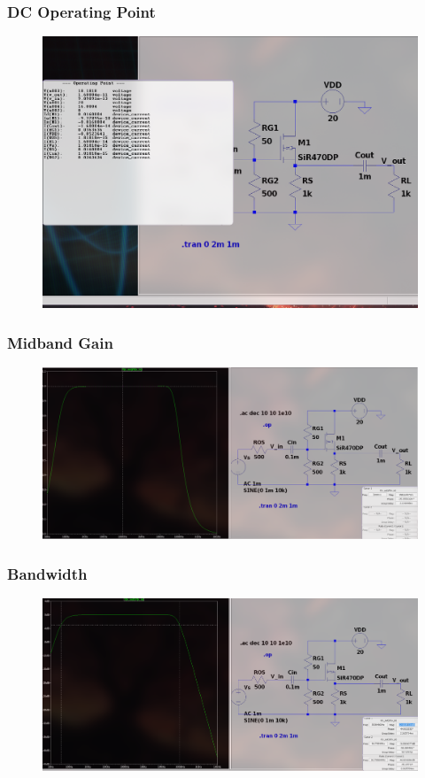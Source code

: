 \documentclass{article}
\begin{document}
\subsubsection{DC Operating Point}
\begin{figure}[h!]
        \centering
        \includegraphics[width=0.7\linewidth]{figs/mosfet_cd_op.png}
    \end{figure}
\pagebreak
\subsubsection{Midband Gain}
\begin{figure}[h!]
        \centering
        \includegraphics[width=0.7\linewidth]{figs/mosfet_cd_mb.png}
    \end{figure}
\subsubsection{Bandwidth}
\begin{figure}[h!]
        \centering
        \includegraphics[width=0.7\linewidth]{figs/mosfet_cd_bw.png}
    \end{figure}
\end{document}
